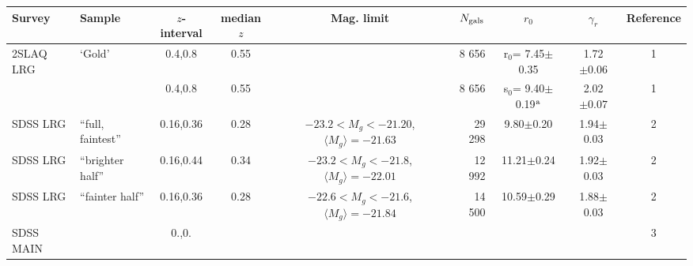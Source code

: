 \documentclass[usenatbib]{mn2e}
\begin{document}
\begin{table}
\baselineskip=20pt
\begin{center}
\setlength{\tabcolsep}{1pt}
\begin{tabular}{llcccrccc}
\hline
\hline
Survey            &   Sample\,\,\,  & $z$-interval &  median $z$     & Mag. limit & $N_{\rm gals}$ & $r_{0}$  & $\gamma_{r}$  & Reference   \\
\hline
\hline
2SLAQ LRG     & `Gold'                &0.4,0.8    & 0.55           &                          &    8 656 & r$_{0}$= 7.45$\pm$0.35          & 1.72$\pm{0.06}$   & 1 \\
              &                       &0.4,0.8    & 0.55           &                          &    8 656 & s$_{0}$= 9.40$\pm$0.19$^{\rm a}$ & 2.02$\pm{0.07}$   & 1 \\
\hline
SDSS LRG      & ``full, faintest''  &0.16,0.36  & 0.28           & $-23.2< M_{g} < -21.20$, $\langle M_{g}\rangle=-21.63$ &   29 298 &  9.80$\pm$0.20 & 1.94$\pm$0.03  & 2 \\
SDSS LRG      & ``brighter half''   &0.16,0.44  & 0.34           & $-23.2< M_{g} < -21.8 $, $\langle M_{g}\rangle=-22.01$ &   12 992 & 11.21$\pm$0.24 & 1.92$\pm$0.03  & 2 \\
SDSS LRG      & ``fainter half''    &0.16,0.36  & 0.28           & $-22.6< M_{g} < -21.6 $, $\langle M_{g}\rangle=-21.84$ &   14 500 & 10.59$\pm$0.29 & 1.88$\pm$0.03  & 2 \\
\hline
SDSS MAIN  &                     &0.,0.      &                &                          &          &                       &             &            3 \\
%

\end{tabular}
\end{center}
\end{table}
\end{document}
